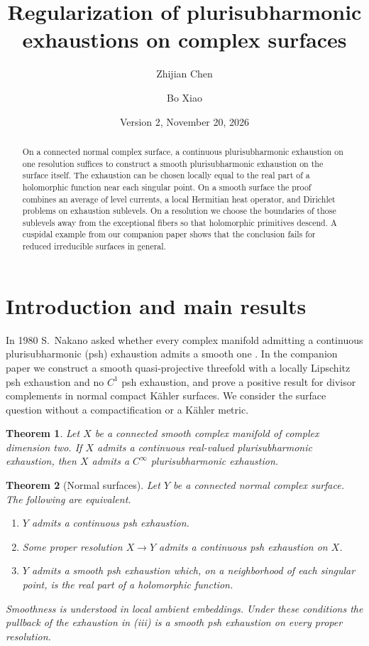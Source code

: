 \documentclass[11pt]{amsart}
\title[Regularization of plurisubharmonic exhaustions]{Regularization of
plurisubharmonic exhaustions on complex surfaces}
\author{Zhijian Chen}
\author{Bo Xiao}
\date{Version 2, November 20, 2026}
\newtheorem{theorem}{Theorem}[section]
\theoremstyle{remark}
\numberwithin{equation}{section}
\begin{document}
\begin{abstract}
On a connected normal complex surface, a continuous plurisubharmonic
exhaustion on one resolution suffices to construct a smooth
plurisubharmonic exhaustion on the surface itself. The exhaustion can
be chosen locally equal to the real part of a holomorphic function near
each singular point. On a smooth surface the proof combines an average
of level currents, a local Hermitian heat operator, and Dirichlet
problems on exhaustion sublevels. On a resolution we choose the
boundaries of those sublevels away from the exceptional fibers so that
holomorphic primitives descend. A cuspidal example from our companion
paper shows that the conclusion fails for reduced irreducible surfaces
in general.
\end{abstract}
\maketitle
\tableofcontents

\section{Introduction and main results}

In 1980 S.~Nakano asked whether every complex manifold admitting a
continuous plurisubharmonic (psh) exhaustion admits a smooth one
\cite[\S I.1, Problem~1, p.~162]{Nakano}. In the companion paper
\cite[Theorems~1.1 and 1.3]{CX} we construct a smooth quasi-projective
threefold with a locally Lipschitz psh exhaustion and no $C^1$ psh
exhaustion, and prove a positive result for divisor complements in normal
compact K\"ahler surfaces. We consider the surface question without a
compactification or a K\"ahler metric.

\begin{theorem}\label{thm:main}
Let \(X\) be a connected smooth complex manifold of complex dimension two.
If \(X\) admits a continuous real-valued plurisubharmonic exhaustion,
then \(X\) admits a \(C^\infty\) plurisubharmonic exhaustion.
\end{theorem}

\begin{theorem}[Normal surfaces]\label{thm:normal}
Let \(Y\) be a connected normal complex surface. The following are
equivalent.
\begin{enumerate}
\item[\textup{(i)}] \(Y\) admits a continuous psh exhaustion.
\item[\textup{(ii)}] Some proper resolution \(X\to Y\) admits a
continuous psh exhaustion on \(X\).
\item[\textup{(iii)}] \(Y\) admits a smooth psh exhaustion which, on a
neighborhood of each singular point, is the real part of a holomorphic
function.
\end{enumerate}
Smoothness is understood in local ambient embeddings. Under these
conditions the pullback of the exhaustion in \textup{(iii)} is a
smooth psh exhaustion on every proper resolution.
\end{theorem}
\end{document}
